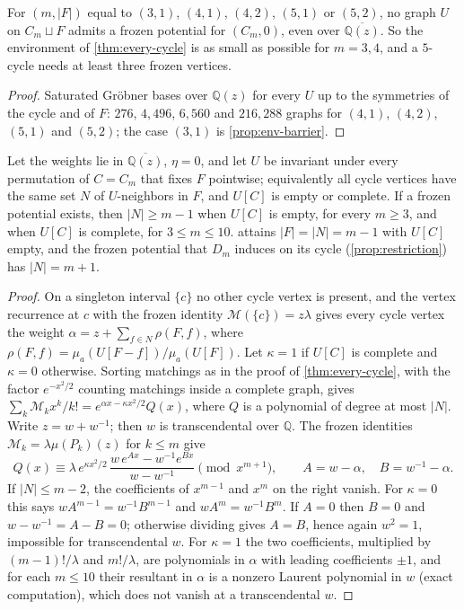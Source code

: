 \documentclass[final]{siamart0516}
\numberwithin{theorem}{section}
\numberwithin{equation}{section}
\theoremstyle{siamnonum}
\theoremstyle{plain}
\newcommand{\QQ}{\mathbb{Q}}
\newcommand{\Qz}{\QQ(z)}
\newcommand{\Qzbar}{\overline{\QQ(z)}}
\newcommand{\Mpot}{\mathcal{M}}           %
\begin{document}
\begin{proposition}\label{prop:smallest-env}
For $(m,|F|)$ equal to $(3,1)$, $(4,1)$, $(4,2)$, $(5,1)$ or $(5,2)$, no graph $U$ on $C_m\sqcup F$ admits a frozen potential for $(C_m,0)$, even over $\Qzbar$. So the environment of \cref{thm:every-cycle} is as small as possible for $m=3,4$, and a $5$-cycle needs at least three frozen vertices.
\end{proposition}
\begin{proof}
Saturated Gr\"obner bases over $\Qz$ for every $U$ up to the symmetries of the cycle and of $F$: $276$, $4{,}496$, $6{,}560$ and $216{,}288$ graphs for $(4,1)$, $(4,2)$, $(5,1)$ and $(5,2)$; the case $(3,1)$ is \cref{prop:env-barrier}.
\end{proof}

\begin{proposition}\label{prop:symmetric-env}
Let the weights lie in $\Qzbar$, $\eta=0$, and let $U$ be invariant under every permutation of $C=C_m$ that fixes $F$ pointwise; equivalently all cycle vertices have the same set $N$ of $U$-neighbors in $F$, and $U[C]$ is empty or complete. If a frozen potential exists, then $|N|\ge m-1$ when $U[C]$ is empty, for every $m\ge3$, and when $U[C]$ is complete, for $3\le m\le10$.  attains $|F|=|N|=m-1$ with $U[C]$ empty, and the frozen potential that $D_m$ induces on its cycle \textup{(}\cref{prop:restriction}\textup{)} has $|N|=m+1$.
\end{proposition}
\begin{proof}
On a singleton interval $\{c\}$ no other cycle vertex is present, and the vertex recurrence at $c$ with the frozen identity $\Mpot(\{c\})=z\lambda$ gives every cycle vertex the weight $\alpha=z+\sum_{f\in N}\rho(F,f)$, where $\rho(F,f)=\mu_a(U[F-f])/\mu_a(U[F])$. Let $\kappa=1$ if $U[C]$ is complete and $\kappa=0$ otherwise. Sorting matchings as in the proof of \cref{thm:every-cycle}, with the factor $e^{-x^2/2}$ counting matchings inside a complete graph, gives $\sum_k\Mpot_kx^{k}/k!=e^{\alpha x-\kappa x^{2}/2}Q(x)$, where $Q$ is a polynomial of degree at most $|N|$. Write $z=w+w^{-1}$; then $w$ is transcendental over $\QQ$. The frozen identities $\Mpot_k=\lambda\mu(P_k)(z)$ for $k\le m$ give
\[
Q(x)\equiv\lambda\,e^{\kappa x^{2}/2}\,\frac{w\,e^{Ax}-w^{-1}e^{Bx}}{w-w^{-1}}\pmod{x^{m+1}},\qquad A=w-\alpha,\quad B=w^{-1}-\alpha.
\]
If $|N|\le m-2$, the coefficients of $x^{m-1}$ and $x^{m}$ on the right vanish. For $\kappa=0$ this says $wA^{m-1}=w^{-1}B^{m-1}$ and $wA^{m}=w^{-1}B^{m}$. If $A=0$ then $B=0$ and $w-w^{-1}=A-B=0$; otherwise dividing gives $A=B$, hence again $w^{2}=1$, impossible for transcendental $w$. For $\kappa=1$ the two coefficients, multiplied by $(m-1)!/\lambda$ and $m!/\lambda$, are polynomials in $\alpha$ with leading coefficients $\pm1$, and for each $m\le10$ their resultant in $\alpha$ is a nonzero Laurent polynomial in $w$ (exact computation), which does not vanish at a transcendental $w$.
\end{proof}
\end{document}
